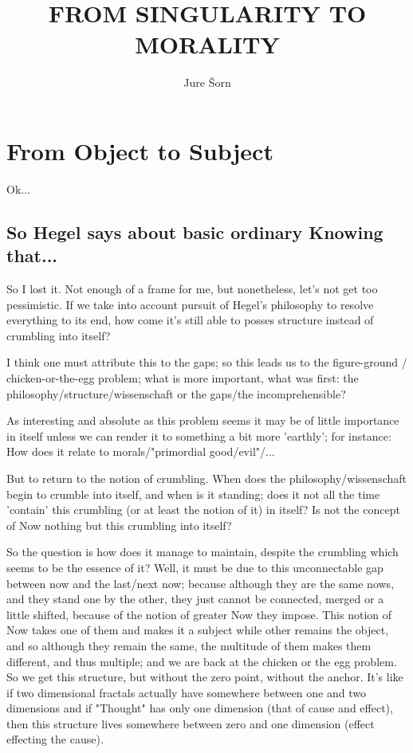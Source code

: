 \documentclass[10pt]{book}
\begin{document}
\title{FROM SINGULARITY TO MORALITY}
\author{Jure \v Sorn}
\maketitle

\tableofcontents

\chapter {From Object to Subject}

Ok...

\section{So Hegel says about basic ordinary Knowing that...}

So I lost it. Not enough of a frame for me, but nonetheless, let's not get too pessimistic. If we take into account pursuit of Hegel's philosophy to resolve everything to its end, how come it's still able to posses structure instead of crumbling into itself?

I think one must attribute this to the gaps; so this leads us to the figure-ground / chicken-or-the-egg problem; what is more important, what was first: the philosophy/structure/wissenschaft or the gaps/the incomprehensible?

As interesting and absolute as this problem seems it may be of little importance in itself unless we can render it to something a bit more 'earthly'; for instance: How does it relate to morals/"primordial good/evil"/...

But to return to the notion of crumbling. When does the philosophy/wissenschaft begin to crumble into itself, and when is it standing; does it not all the time 'contain' this crumbling (or at least the notion of it) in itself? Is not the concept of Now nothing but this crumbling into itself?

So the question is how does it manage to maintain, despite the crumbling which seems to be the essence of it? Well, it must be due to this unconnectable gap between now and the last/next now; because although they are the same nows, and they stand one by the other, they just cannot be connected, merged or a little shifted, because of the notion of greater Now they impose. This notion of Now takes one of them and makes it a subject while other remains the object, and so although they remain the same, the multitude of them makes them different, and thus multiple; and we are back at the chicken or the egg problem. So we get this structure, but without the zero point, without the anchor. It's like if two dimensional fractals actually have somewhere between one and two dimensions and if "Thought" has only one dimension (that of cause and effect), then this structure lives somewhere between zero and one dimension (effect effecting the cause). 
\end{document}
